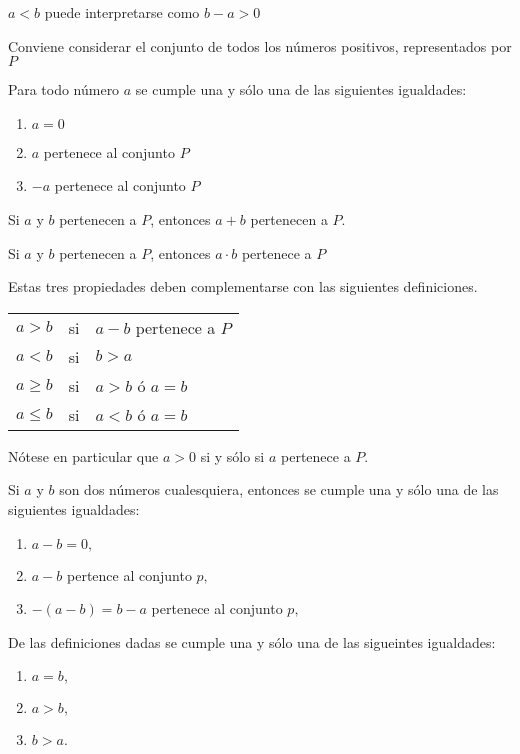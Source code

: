 \begin{def.}
$a<b$ puede interpretarse como $b-a>0$ \\
\end{def.}
Conviene considerar el conjunto de todos los números positivos, representados por $P$\\

\begin{prop} Para todo número $a$ se cumple una y sólo una de las siguientes igualdades:
\begin{enumerate}[\bfseries i)]
\item $a=0$
\item $a$ pertenece al conjunto $P$
\item $-a$ pertenece al conjunto $P$
\end{enumerate}
\end{prop}

\begin{prop} Si $a$ y $b$ pertenecen a $P$, entonces $a+b$ pertenecen a $P$.
\end{prop}

\begin{prop} Si $a$ y $b$ pertenecen a $P$, entonces $a\cdot b$ pertenece a $P$
\end{prop}

\begin{def.} Estas tres propiedades deben complementarse con las siguientes definiciones.
\begin{center}
\begin{tabular}{r c l}
$a>b$&si&$a-b$ pertenece a $P$\\
$a<b$&si&$b>a$\\
$a\geq b $&si&$a>b$ ó $a=b$\\
$a\leq b$&si&$a<b$ ó $a=b$\\
\end{tabular}
Nótese en particular que $a>0$ si y sólo si $a$ pertenece a $P$.\\
\end{center}
\end{def.}

\begin{def.}
Si $a$ y $b$ son dos números cualesquiera, entonces se cumple una y sólo una de las siguientes igualdades:
\begin{enumerate}[\bfseries i)]
\item $a-b=0,$
\item $a-b$ pertence al conjunto $p,$
\item $-(a-b) = b-a$ pertenece al conjunto $p,$
\end{enumerate}
De las definiciones dadas se cumple una y sólo una de las sigueintes igualdades:
\begin{enumerate}[\bfseries i)]
\item $a=b,$
\item  $a>b,$
\item $b>a.$
\end{enumerate}
\end{def.}

